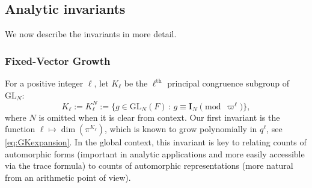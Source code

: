 \documentclass{amsart}
\newcommand{\m}[1]{\mathbf{#1}}
\newcommand{\GL}{\mathrm{GL}}
\newcommand{\1}{\m 1}
\theoremstyle{remark}
\theoremstyle{definition}
\numberwithin{equation}{subsection}
\begin{document}








\subsection{Analytic invariants}
We now describe the invariants in more detail.%

\subsubsection{Fixed-Vector Growth}

For a positive integer $\ell$, let $K_\ell$ be the $\ell^{\text{th}}$ principal congruence subgroup of $\GL_N$:
\[
K_\ell := K_\ell^N := \{g \in \GL_N(F) \,:\, g \equiv \m I_N \pmod{\varpi^\ell} \},
\]
where $N$ is omitted when it is clear from context. Our first invariant is the function $\ell \mapsto \dim(\pi^{K_\ell})$, which is known to grow polynomially in $q^{\ell}$, see \eqref{eq:GKexpansion}. In the global context, this invariant is key to relating counts of automorphic forms (important in analytic applications and more easily accessible via the trace formula) to counts of automorphic representations (more natural from an arithmetic point of view).
\end{document}
